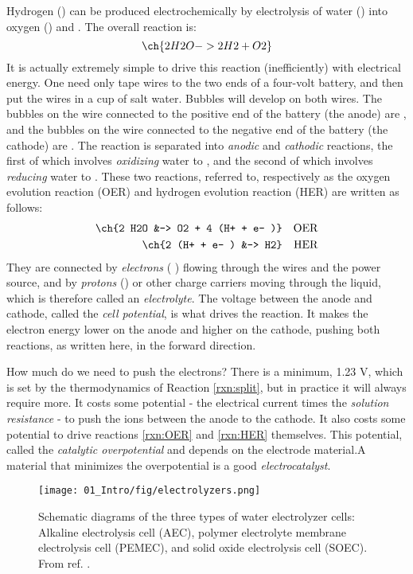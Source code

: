 \vspace{5mm}
Hydrogen () can be produced electrochemically by electrolysis of water () into oxygen () and . The overall reaction is:
\begin{equation}
\ch{2 H2O -> 2 H2 + O2}\label{rxn:split}
\end{equation}
It is actually extremely simple to drive this reaction (inefficiently) with electrical energy. One need only tape wires to the two ends of a four-volt battery, and then put the wires in a cup of salt water. Bubbles will develop on both wires. The bubbles on the wire connected to the positive end of the battery (the anode) are , and the bubbles on the wire connected to the negative end of the battery (the cathode) are . The reaction is separated into \textit{anodic} and \textit{cathodic} reactions, the first of which involves \textit{oxidizing} water to , and the second of which involves \textit{reducing} water to . These two reactions, referred to, respectively as the oxygen evolution reaction (OER) and hydrogen evolution reaction (HER) are written as follows:
\begin{align}
\ch{2 H2O &-> O2 + 4 (H+ + e- )} &&\text{OER}\label{rxn:OER}\\
\ch{2 (H+ + e- ) &-> H2} &&\text{HER}\label{rxn:HER}
\end{align}
They are connected by \textit{electrons} ( ) flowing through the wires and the power source, and by \textit{protons} () or other charge carriers moving through the liquid, which is therefore called an \textit{electrolyte}. The voltage between the anode and cathode, called the \textit{cell potential}, is what drives the reaction. It makes the electron energy lower on the anode and higher on the cathode, pushing both reactions, as written here, in the forward direction. 

How much do we need to push the electrons? There is a minimum, 1.23 V, which is set by the thermodynamics of Reaction \ref{rxn:split}, but in practice it will always require more. It costs some potential - the electrical current times the \textit{solution resistance} - to push the ions between the anode to the cathode. It also costs some potential to drive reactions \ref{rxn:OER} and \ref{rxn:HER} themselves. This potential, called the \textit{catalytic overpotential} and depends on the electrode material.A material that minimizes the overpotential is a good \textit{electrocatalyst}.

\begin{figure}[t]
	\centering
	\texttt{[image: 01\_Intro/fig/electrolyzers.png]}
	\caption{Schematic diagrams of the three types of water electrolyzer cells: Alkaline electrolysis cell (AEC), polymer electrolyte membrane electrolysis cell (PEMEC), and solid oxide electrolysis cell (SOEC). From ref. .}
	\label{fig:electrolyzers}
\end{figure}

